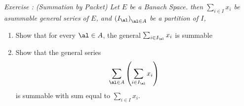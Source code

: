 \begin{center}
       \it Exercise : (Summation by Packet)  \normalfont
       Let $E $ be a Banach Space. 
       then 
       $\sum_{ i \in I}^{}  x_{i}$ be asummable general 
       series of $E $, and 
       $\left( I_{\al} \right)_{\al \in A} $  be a partition of $I $,
       \begin{enumerate}
       \item Show that for every $\al \in  A $, the general 
	       $\sum_{i \in  I_{\al}}^{} x_{i} $  is summable 

	      \item 
		      Show that the general series 
		      \[
		      \sum_{ \al \in  A}^{}  
		      \left( \sum_{i \in  I_{\al}}^{} x_{i} \right)
		      \]
		      is summable with sum equal to 
		      $\sum_{i \in  I}^{} x_{i} $.
       \end{enumerate}
\end{center}

%  
